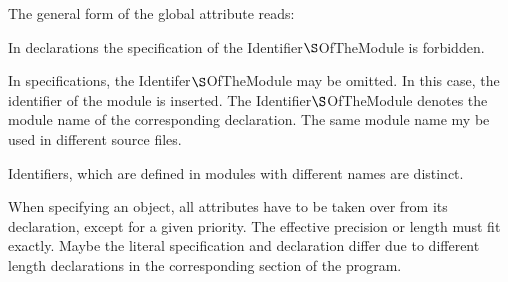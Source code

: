 The general form of the global attribute reads:



In declarations the specification of the Identifier$\S $OfTheModule 
is forbidden.

In specifications, the Identifer$\S $OfTheModule  may be omitted. 
In this case, the identifier of the module is inserted.
The Identifier$\S $OfTheModule denotes the module name of the corresponding
declaration.
The same module name my be used in different source files.

Identifiers, which are defined in modules with different names are distinct.



When specifying an object, all attributes have to be taken over from its
declaration, except for a given priority. 
The effective precision or length 
must fit exactly. Maybe the literal specification and declaration differ 
due to different length declarations
 in the corresponding section of the program.

